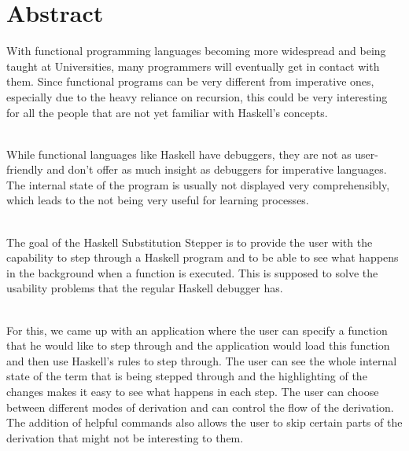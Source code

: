 \chapter*{Abstract}

With functional programming languages becoming more widespread and being taught at Universities,
many programmers will eventually get in contact with them.
Since functional programs can be very different from imperative ones,
especially due to the heavy reliance on recursion,
this could be very interesting for all the people that are not yet familiar with Haskell's concepts.

\ \\
While functional languages like Haskell have debuggers,
they are not as user-friendly and don't offer as much insight as debuggers for imperative languages.
The internal state of the program is usually not displayed very comprehensibly,
which leads to the not being very useful for learning processes.

\ \\
The goal of the Haskell Substitution Stepper is to provide the user with the capability to step through a Haskell program
and to be able to see what happens in the background when a function is executed.
This is supposed to solve the usability problems that the regular Haskell debugger has.

\ \\
For this, we came up with an application where the user can specify a function that he would like to step through
and the application would load this function and then use Haskell's rules to step through.
The user can see the whole internal state of the term that is being stepped through
and the highlighting of the changes makes it easy to see what happens in each step.
The user can choose between different modes of derivation and can control the flow of the derivation.
The addition of helpful commands also allows the user to skip certain parts of the derivation that might not be interesting to them.
